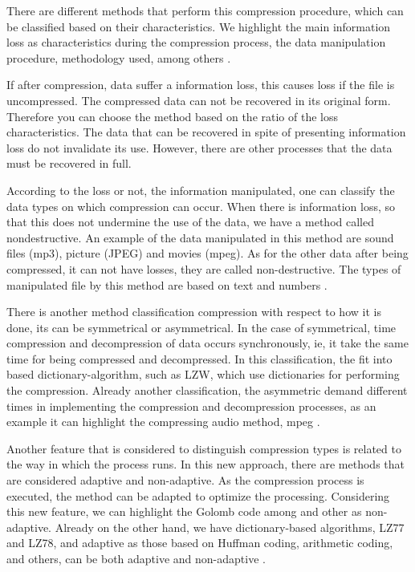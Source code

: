 \documentclass[10pt]{article}
\begin{document}
There are different methods that perform this compression procedure, which can 
be classified based on their characteristics. We highlight the main information 
loss as characteristics during the compression process, the data manipulation 
procedure, methodology used, among others \cite{salomon2}. 

If after compression, data suffer a information loss, this causes loss if the 
file is uncompressed. The compressed data can not be recovered in its original 
form. Therefore you can choose the method based on the ratio of the loss 
characteristics. The data that can be recovered in spite of presenting 
information loss do not invalidate its use. However, there are other processes 
that the data must be recovered in full. 

According to the loss or not, the information manipulated, one can classify the 
data types on which compression can occur. When there is information loss, so 
that this does not undermine the use of the data, we have a method called 
nondestructive. An example of the data manipulated in this method are sound 
files (mp3), picture (JPEG) and movies (mpeg). As for the other data after being 
compressed, it can not have losses, they are called non-destructive. The types 
of manipulated file by this method are based on text and numbers 
\cite{salomon,salomon2}. 

There is another method classification compression with respect to how it is 
done, its can be symmetrical or asymmetrical. In the case of symmetrical, time 
compression and decompression of data occurs synchronously, ie, it take the same 
time for being compressed and decompressed. In this classification, the fit into 
based dictionary-algorithm, such as LZW, which use dictionaries for performing 
the compression. Already another classification, the asymmetric demand different 
times in implementing the compression and decompression processes, as an example 
it can highlight the compressing audio method, mpeg \cite{salomon,salomon2}. 

Another feature that is considered to distinguish compression types is related 
to the way in which the process runs. In this new approach, there are methods 
that are considered adaptive and non-adaptive. As the compression process is 
executed, the method can be adapted to optimize the processing. Considering this 
new feature, we can highlight the Golomb code among and other as non-adaptive. 
Already on the other hand, we have dictionary-based algorithms, LZ77 and LZ78, 
and adaptive as those based on Huffman coding, arithmetic coding, and others, 
can be both adaptive and non-adaptive \cite{salomon, salomon2}. 
\end{document}
